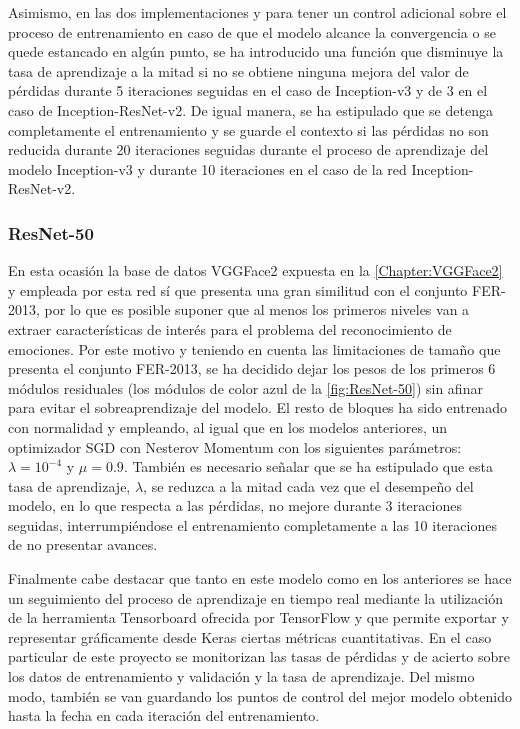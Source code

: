 Asimismo, en las dos implementaciones y para tener un control adicional sobre el proceso de entrenamiento en caso de que el modelo alcance la convergencia o se quede estancado en algún punto, se ha introducido una función que disminuye la tasa de aprendizaje a la mitad si no se obtiene ninguna mejora del valor de pérdidas durante 5 iteraciones seguidas en el caso de Inception-v3 y de 3 en el caso de Inception-ResNet-v2. De igual manera, se ha estipulado que se detenga completamente el entrenamiento y se guarde el contexto si las pérdidas no son reducida durante 20 iteraciones seguidas durante el proceso de aprendizaje del modelo Inception-v3 y durante 10 iteraciones en el caso de la red Inception-ResNet-v2.

\subsubsection{ResNet-50}

En esta ocasión la base de datos VGGFace2 expuesta en la \autoref{Chapter:VGGFace2} y empleada por esta red sí que presenta una gran similitud con el conjunto FER-2013, por lo que es posible suponer que al menos los primeros niveles van a extraer características de interés para el problema del reconocimiento de emociones. Por este motivo y teniendo en cuenta las limitaciones de tamaño que presenta el conjunto FER-2013, se ha decidido dejar los pesos de los primeros 6 módulos residuales (los módulos de color azul de la \autoref{fig:ResNet-50}) sin afinar para evitar el sobreaprendizaje del modelo. El resto de bloques ha sido entrenado con normalidad y empleando, al igual que en los modelos anteriores, un optimizador SGD con Nesterov Momentum con los siguientes parámetros: $\lambda = 10^{-4}$ y $\mu = 0.9$. También es necesario señalar que se ha estipulado que esta tasa de aprendizaje, $\lambda$, se reduzca a la mitad cada vez que el desempeño del modelo, en lo que respecta a las pérdidas, no mejore durante 3 iteraciones seguidas, interrumpiéndose el entrenamiento completamente a las 10 iteraciones de no presentar avances.

Finalmente cabe destacar que tanto en este modelo como en los anteriores se hace un seguimiento del proceso de aprendizaje en tiempo real mediante la utilización de la herramienta Tensorboard ofrecida por TensorFlow y que permite exportar y representar gráficamente desde Keras ciertas métricas cuantitativas. En el caso particular de este proyecto se monitorizan las tasas de pérdidas y de acierto sobre los datos de entrenamiento y validación y la tasa de aprendizaje. Del mismo modo, también se van guardando los puntos de control del mejor modelo obtenido hasta la fecha en cada iteración del entrenamiento.

